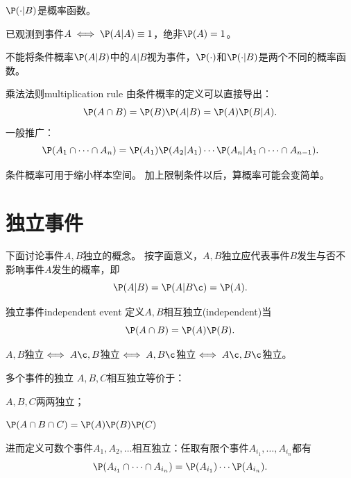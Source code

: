 \begin{corollary}
	$\P(\cdot|B)$是概率函数。
\end{corollary}

\begin{corollary}
	已观测到事件$A\iff\P(A|A)\equiv 1$，绝非$\P(A)=1$。
\end{corollary}

\begin{remark}
	不能将条件概率$\P(A|B)$中的$A|B$视为事件，$\P(\cdot)$和$\P(\cdot|B)$是两个不同的概率函数。
\end{remark}

\begin{theorem}{乘法法则}{multiplication rule}
	由条件概率的定义可以直接导出：
	\begin{equation}
		\P(A\cap B)=\P(B)\P(A|B)=\P(A)\P(B|A).
	\end{equation}
	一般推广：
	\begin{equation}
		\P(A_1\cap\cdots\cap A_n)=\P(A_1)\P(A_2|A_1)\cdots\P(A_n|A_1\cap\cdots\cap A_{n-1}).
	\end{equation}
\end{theorem}

\begin{remark}
	条件概率可用于缩小样本空间。
	加上限制条件以后，算概率可能会变简单。
\end{remark}

\section{独立事件}

下面讨论事件$A,B$独立的概念。
按字面意义，$A,B$独立应代表事件$B$发生与否不影响事件$A$发生的概率，即
\[
	\P(A|B)=\P(A|B\c)=\P(A).
\]

\begin{definition}{独立事件}{independent event}
	定义$A,B$相互独立(independent)当
	\begin{equation}
		\P(A\cap B)=\P(A)\P(B).
	\end{equation}
\end{definition}

\begin{corollary}
	$A,B$独立$\iff A\c,B$独立$\iff A,B\c$独立$\iff A\c,B\c$独立。
\end{corollary}

\begin{definition}{多个事件的独立}{}
	$A,B,C$相互独立等价于：
	\begin{compactenum}
		\item $A,B,C$两两独立；
		\item $\P(A\cap B\cap C)=\P(A)\P(B)\P(C)$
	\end{compactenum}
	进而定义可数个事件$A_1,A_2,\ldots$相互独立：任取有限个事件$A_{i_1},\ldots,A_{i_n}$都有
	\[
		\P(A_{i_1}\cap\cdots\cap A_{i_n})=\P(A_{i_1})\cdots\P(A_{i_n}).
	\]
\end{definition}

